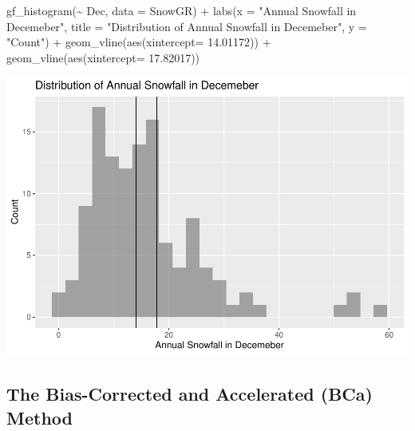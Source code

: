 \documentclass[12pt]{article}
\newenvironment{Shaded}{\begin{snugshade}}{\end{snugshade}}
\newcommand{\AttributeTok}[1]{\textcolor[rgb]{0.77,0.63,0.00}{#1}}
\newcommand{\FloatTok}[1]{\textcolor[rgb]{0.00,0.00,0.81}{#1}}
\newcommand{\FunctionTok}[1]{\textcolor[rgb]{0.00,0.00,0.00}{#1}}
\newcommand{\NormalTok}[1]{#1}
\newcommand{\SpecialCharTok}[1]{\textcolor[rgb]{0.00,0.00,0.00}{#1}}
\newcommand{\StringTok}[1]{\textcolor[rgb]{0.31,0.60,0.02}{#1}}
\begin{document}
\begin{Shaded}
\begin{Highlighting}[]
\FunctionTok{gf\_histogram}\NormalTok{(}\SpecialCharTok{\textasciitilde{}}\NormalTok{ Dec, }\AttributeTok{data =}\NormalTok{ SnowGR) }\SpecialCharTok{+}
  \FunctionTok{labs}\NormalTok{(}\AttributeTok{x =} \StringTok{"Annual Snowfall in Decemeber"}\NormalTok{, }\AttributeTok{title =} \StringTok{"Distribution of Annual Snowfall in Decemeber"}\NormalTok{, }\AttributeTok{y =} \StringTok{"Count"}\NormalTok{) }\SpecialCharTok{+}
  \FunctionTok{geom\_vline}\NormalTok{(}\FunctionTok{aes}\NormalTok{(}\AttributeTok{xintercept=} \FloatTok{14.01172}\NormalTok{)) }\SpecialCharTok{+}
  \FunctionTok{geom\_vline}\NormalTok{(}\FunctionTok{aes}\NormalTok{(}\AttributeTok{xintercept=} \FloatTok{17.82017}\NormalTok{))}
\end{Highlighting}
\end{Shaded}

\includegraphics{paper_files/figure-latex/unnamed-chunk-12-1.pdf}

\hypertarget{the-bias-corrected-and-accelerated-bca-method}{%
\subsection{The Bias-Corrected and Accelerated (BCa)
Method}\label{the-bias-corrected-and-accelerated-bca-method}}
\end{document}
